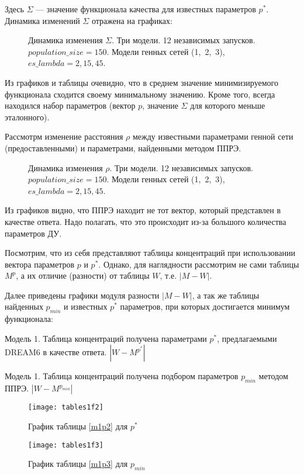 Здесь $\Sigma$ — значение функционала качества для известных параметров $p^*$.
Динамика изменений $\Sigma$ отражена на графиках:

\begin{figure}[h]
  \center{\texttt{[image: p150]}}
  \caption{Динамика изменения $\Sigma$. Три модели. 12 независимых запусков. 
  $population\_size = 150$. Модели генных сетей (1,~2,~3), 
  $es\_lambda = 2, 15, 45$.}
  \label{img:p150}
\end{figure}

Из графиков и таблицы очевидно, что в среднем значение минимизируемого 
функционала сходится своему минимальному значению. Кроме того, всегда находился 
набор параметров (вектор $p$, значение $\Sigma$ для которого меньше эталонного).

Рассмотрм изменение расстояния $\rho$ между известными параметрами генной сети 
(предоставленными) и параметрами, найденными методом ППРЭ.

\begin{figure}[h]
  \center{\texttt{[image: p150e]}}
  \caption{Динамика изменения $\rho$. Три модели. 12 независимых запусков. 
  $population\_size = 150$. Модели генных сетей (1,~2,~3), 
  $es\_lambda = 2, 15, 45$. }
  \label{img:p150}
\end{figure}

Из графиков видно, что ППРЭ находит не тот вектор, который представлен в 
качестве ответа. Надо полагать, что это происходит из-за большого количества 
параметров ДУ.

Посмотрим, что из себя представляют таблицы концентраций при использовании 
вектора параметров $p$ и $p^*$. Однако, для наглядности рассмотрим не сами 
таблицы $M^p$, а их отличие (разности) от таблицы $W$, т.е. $|M - W|$.

Далее приведены графики модуля разности $|M - W|$, а так же таблицы найденных 
$p_{min}$ и известных $p^*$ параметров, при которых достигается минимум 
функционала:


\begin{table}[h]
  \centering
  
  \caption{Модель 1. Таблица концентраций получена параметрами $p^*$, 
  предлагаемыми DREAM6 в качестве ответа. $|W - M^{p^*}|$}
  \label{m1p2}
\end{table}
\begin{table}[h]
  \centering
  
  \caption{Модель 1. Таблица концентраций получена подбором параметров 
  $p_{min}$ методом ППРЭ. $|W - M^{p_{min}}|$}
  \label{m1p3}
\end{table}
\begin{figure}[h]
  \begin{minipage}[h]{0.5\linewidth}
    \texttt{[image: tables1f2]}
    \caption{График таблицы \ref{m1p2} для $p^*$}
  \end{minipage}
  \hfill
  \begin{minipage}[h]{0.5\linewidth}
    \texttt{[image: tables1f3]}
    \caption{График таблицы \ref{m1p3} для $p_{min}$}
  \end{minipage}
\end{figure}


